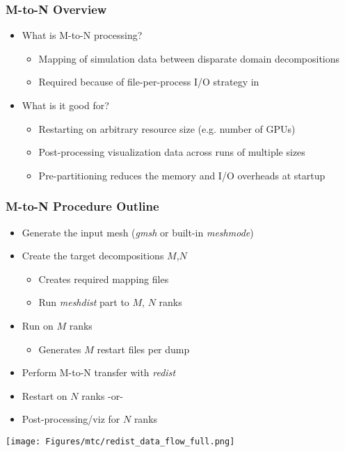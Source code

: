 \begin{frame}\frametitle{M-to-N Overview}
  \begin{itemize}
  \item What is M-to-N processing?
    \begin{itemize}
    \item Mapping of simulation data between disparate domain decompositions
    \item Required because of file-per-process I/O strategy in \mirgecom{}
    \end{itemize}
  \item What is it good for?
    \begin{itemize}
    \item Restarting \mirgecom{} on arbitrary resource size (e.g. number of GPUs)
    \item Post-processing visualization data across runs of multiple sizes
    \item Pre-partitioning reduces the memory and I/O overheads at \mirgecom{} startup
    \end{itemize}
  \end{itemize}
\end{frame}

\begin{frame}\frametitle{M-to-N Procedure Outline}
\begin{minipage}{0.49\textwidth}
\begin{itemize}
\item Generate the input mesh (\textit{gmsh} or built-in \textit{meshmode})
\item Create the target decompositions $M$,$N$
  \begin{itemize}
  \item Creates required mapping files
  \item Run \textit{meshdist} part to $M$, $N$ ranks
  \end{itemize}
\item Run \mirgecom{} on $M$ ranks
\begin{itemize}
\item Generates $M$ restart files per dump
\end{itemize}
\item Perform M-to-N transfer with \textit{redist}
\item Restart \mirgecom{} on $N$ ranks -or-
\item Post-processing/viz for $N$ ranks
\end{itemize}
\end{minipage}
\hfill
\begin{minipage}{.49\textwidth}
\texttt{[image: Figures/mtc/redist\_data\_flow\_full.png]}
\end{minipage}
\end{frame}


